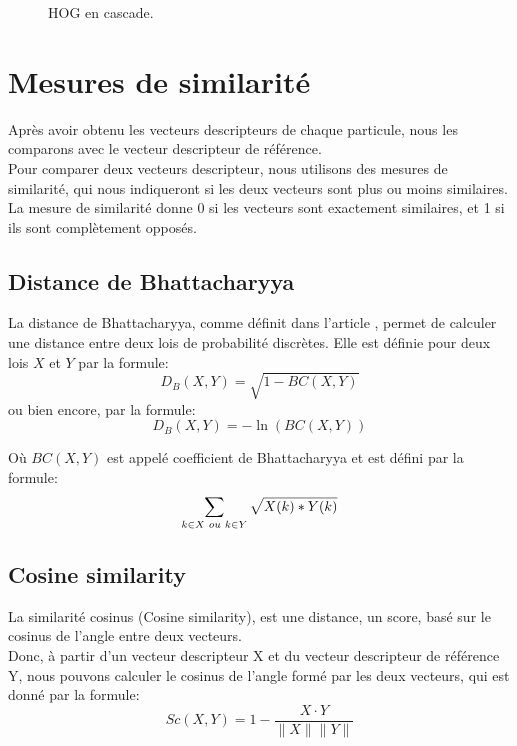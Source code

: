 \begin{figure}[!htbp]
\center
\caption{HOG en cascade.}
\label{fig:cuttlefish_hog}
\end{figure}
\FloatBarrier




\section{Mesures de similarité}
Après avoir obtenu les vecteurs descripteurs de chaque particule, nous les comparons avec le vecteur descripteur de référence.\\
Pour comparer deux vecteurs descripteur, nous utilisons des mesures de similarité, qui nous indiqueront si les deux vecteurs sont plus ou moins similaires. La mesure de similarité donne 0 si les vecteurs sont exactement similaires, et 1 si ils sont complètement opposés.

\subsection{Distance de Bhattacharyya}
La distance de Bhattacharyya, comme définit dans l'article \cite{bhattacharyya_measure_1960}, permet de calculer une distance entre deux lois de probabilité discrètes. Elle est définie pour deux lois $X$ et $Y$ par la formule:
$$D_{B}(X, Y) = \sqrt{1 - BC(X, Y)}$$
ou bien encore, par la formule:
$$D_{B}(X, Y) = -\ln(BC(X, Y))$$

Où $BC(X, Y)$ est appelé coefficient de Bhattacharyya et est défini par la formule:
$$\sum_{k \in X \hspace{0.1cm} ou \hspace{0.1cm} k \in Y} \sqrt{X(k)*Y(k)}$$


\subsection{Cosine similarity}
La similarité cosinus (Cosine similarity), est une distance, un score, basé sur le cosinus de l'angle entre deux vecteurs.\\
Donc, à partir d'un vecteur descripteur X et du vecteur descripteur de référence Y, nous pouvons calculer le cosinus de l'angle formé par les deux vecteurs, qui est donné par la formule:
$$Sc(X, Y) = 1 - \frac{X \cdot Y}{\|X\|\|Y\|}$$\\


